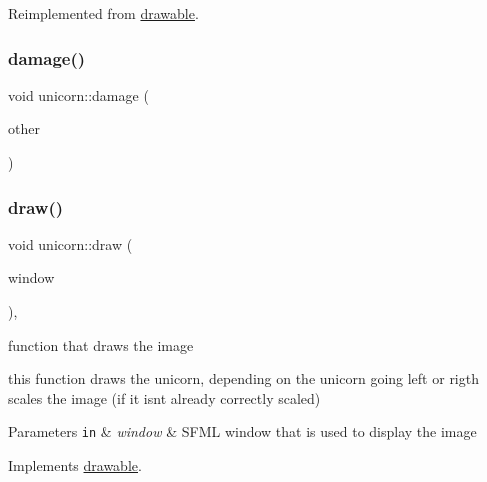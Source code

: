 Reimplemented from \hyperlink{classdrawable_abbc6e0089d502ba48c3fcb9c96e3966e}{drawable}.

\mbox{\label{classunicorn_a8b5a22ab1b26daa540ceb09b5b5747d8}} 
\subsubsection{\texorpdfstring{damage()}{damage()}}
{\footnotesize\ttfamily void unicorn\+::damage (\begin{DoxyParamCaption}\item[{\hyperlink{npc_8hpp_a09ee7f853fc9bc830a9445a06fd53d4b}{mob\+\_\+ptr}}]{other }\end{DoxyParamCaption})}

\mbox{\label{classunicorn_a570c34d5669a8d2a61bdc1481e6f9dee}} 
\subsubsection{\texorpdfstring{draw()}{draw()}}
{\footnotesize\ttfamily void unicorn\+::draw (\begin{DoxyParamCaption}\item[{sf\+::\+Render\+Window \&}]{window }\end{DoxyParamCaption})\hspace{0.3cm}{\ttfamily [override]}, {\ttfamily [virtual]}}



function that draws the image 

this function draws the unicorn, depending on the unicorn going left or rigth scales the image (if it isn\textquotesingle{}t already correctly scaled)


\begin{DoxyParams}[1]{Parameters}
\mbox{\tt in}  & {\em window} & S\+F\+ML window that is used to display the image \\
\hline
\end{DoxyParams}


Implements \hyperlink{classdrawable_a4e49e2c1121704c83ce24c5f48dd910f}{drawable}.

\mbox{\label{classunicorn_a1bac09fc59b04f14f5a093bc4daa04da}} 

